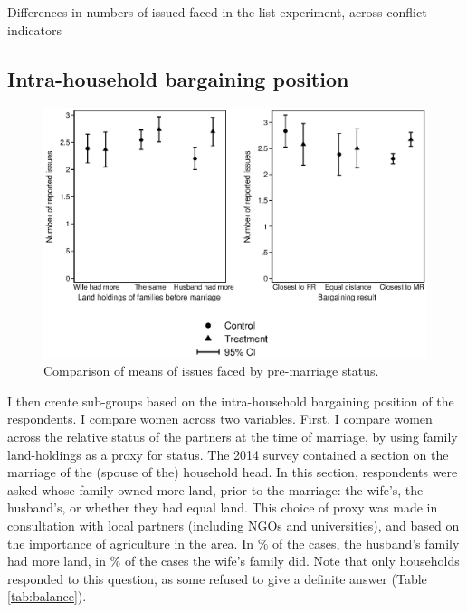 \begin{table}[htb]
\caption{Differences in numbers of issued faced in the list experiment, across conflict indicators}
\label{tab:meandiff_conf}
\end{table}

\subsection{Intra-household bargaining position}
\begin{figure}[htb]
  \includegraphics[width=\linewidth]{chapters/congogbv/figures/meancompare_mar.eps}
  \caption{Comparison of means of issues faced by pre-marriage status.}
  \label{fig:meancompare_mar}
\end{figure}

I then create sub-groups based on the intra-household bargaining position of the respondents. I compare women across two variables. First, I compare women across the relative status of the partners at the time of marriage, by using family land-holdings as a proxy for status. The 2014 survey contained a section on the marriage of the (spouse of the) household head. In this section, respondents were asked whose family owned more land, prior to the marriage: the wife's, the husband's, or whether they had equal land. This choice of proxy was made in consultation with local partners (including NGOs and universities), and based on the importance of agriculture in the area. In \% of the cases, the husband's family had more land, in \% of the cases the wife's family did. Note that only  households responded to this question, as some refused to give a definite answer (Table \ref{tab:balance}). 

